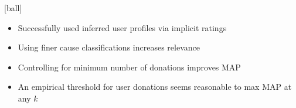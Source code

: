 
[ball]
\begin{itemize}
    \item Successfully used inferred user profiles via implicit ratings
	\item Using finer cause classifications increases relevance
    \item Controlling for minimum number of donations improves MAP
    \item An empirical threshold for user donations seems reasonable to max MAP at any $k$
\end{itemize}
\vspace{3ex}